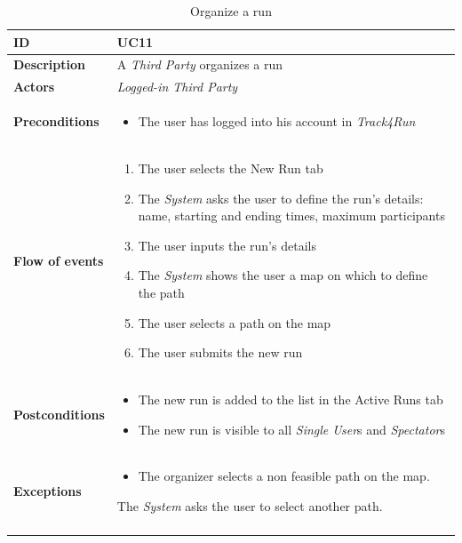 \documentclass[titlepage]{article}
\begin{document}
\begin{longtable}{| p{3 cm} | p{10 cm} |} 
			\hline
			{\bf ID} & UC11 \\
			\hline
			{\bf Description} & A {\it Third Party} organizes a run  \\
			\hline
			{\bf Actors} & {\it Logged-in {\it Third Party} }\\
			\hline
			{\bf Preconditions} & 		
							\begin{itemize}
								\item The user has logged into his account in {\it Track4Run}
							\end{itemize}
			\\
			\hline
			{\bf Flow of events} & 
							\begin{enumerate}
								\item The user selects the New Run tab
\item The {\it System} asks the user to define the run’s details: name, starting and ending times, maximum participants
\item The user inputs the run’s details
\item The {\it System} shows the user a map on which to define the path
\item The user selects a path on the map
\item The user submits the new run
							\end{enumerate}
			
			 \\
			\hline
			{\bf Postconditions} & 
							\begin{itemize}
								\item The new run is added to the list in the Active Runs tab
\item The new run is visible to all {\it Single User}s and {\it Spectator}s

							\end{itemize}
			\\
			\hline
			{\bf Exceptions} & 
							\begin{itemize}
								\item The organizer selects a non feasible path on the map.
							\end{itemize}
							The {\it System} asks the user to select another path.						
			\\
			\hline
			\caption{Organize a run}
			\end{longtable}
\end{document}
